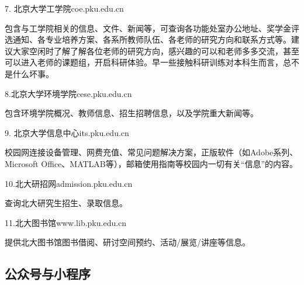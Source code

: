 \documentclass[11pt,oneside]{book}
\begin{document}
7. 北京大学工学院\quad coe.pku.edu.cn

包含与工学院相关的信息、文件、新闻等，可查询各功能处室办公地址、奖学金评选通知、各专业培养方案、各系所教师队伍、各老师的研究方向和联系方式等。建议大家空闲时了解了解各位老师的研究方向，感兴趣的可以和老师多多交流，甚至可以进入老师的课题组，开启科研体验。早一些接触科研训练对本科生而言，总不是什么坏事。

\vspace{10pt}

8.北京大学环境学院\quad cese.pku.edu.cn

包含环境学院概况、教师信息、招生招聘信息，以及学院重大新闻等。

\vspace{10pt}

9. 北京大学信息中心\quad its.pku.edu.cn

校园网连接设备管理、网费充值、常见问题解决方案，正版软件（如Adobe系列、Microsoft Office、MATLAB等），邮箱使用指南等校园内一切有关“信息”的内容。

\vspace{10pt}

10.北大研招网\quad admission.pku.edu.cn

查询北大研究生招生、录取信息。

\vspace{10pt}

11.北大图书馆\quad www.lib.pku.edu.cn

提供北大图书馆图书借阅、研讨空间预约、活动/展览/讲座等信息。
	
\newpage

\subsection{公众号与小程序}
\end{document}
